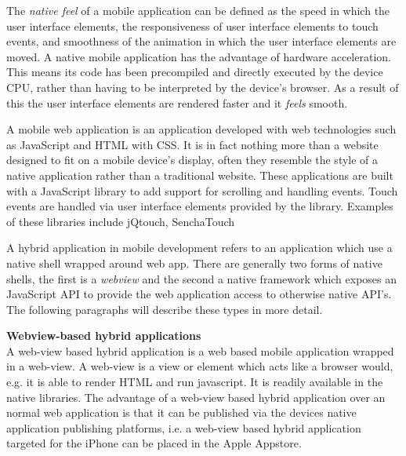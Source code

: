 
The \emph{native feel} of a mobile application can be defined as the speed in which the user interface elements, the responsiveness of user interface elements to touch events, and smoothness of the animation in which the user interface elements are moved. A native mobile application has the advantage of hardware acceleration. This means its code has been precompiled and directly executed by the device CPU, rather than having to be interpreted by the device's browser. As a result of this the user interface elements are rendered faster and it \emph{feels} smooth.


A mobile web application is an application developed with web technologies such as JavaScript and HTML with CSS. It is in fact nothing more than a website designed to fit on a mobile device's display, often they resemble the style of a native application rather than a traditional website. These applications are built with a JavaScript library to add support for scrolling and handling events. Touch events are handled via user interface elements provided by the library. Examples of these libraries include jQtouch, SenchaTouch


A hybrid application in mobile development refers to an application which use a native shell wrapped around web app. There are generally two forms of native shells, the first is a \emph{webview} and the second a native framework which exposes an JavaScript API to provide the web application access to otherwise native API's. The following paragraphs will describe these types in more detail.

{\bf Webview-based hybrid applications}\\
A web-view based hybrid application is a web based mobile application wrapped in a web-view. A web-view is a view or element which acts like a browser would, e.g. it is able to render HTML and run javascript.  It is readily available in the native libraries. The advantage of a web-view based hybrid application over an normal web application is that it can be published via the devices native application publishing platforms, i.e. a web-view based hybrid application targeted for the iPhone can be placed in the Apple Appstore. 

